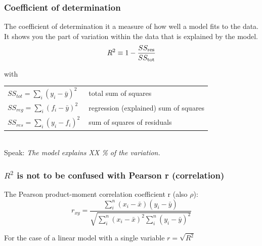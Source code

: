 \documentclass[xcolor=table, xcolor=dvipsnames]{beamer}\usepackage[]{graphicx}\usepackage[]{color}
\makeatletter
\newcommand{\hlcom}[1]{\textcolor[rgb]{0,0.392,0}{\textit{#1}}}
\newcommand{\hlopt}[1]{\textcolor[rgb]{0,0,0}{#1}}
\newcommand{\hlstd}[1]{\textcolor[rgb]{0,0,0}{#1}}
\newcommand{\hlkwd}[1]{\textcolor[rgb]{0,0,1}{#1}}
\newenvironment{kframe}{%
 \def\at@end@of@kframe{}%
 \ifinner\ifhmode%
  \def\at@end@of@kframe{\end{minipage}}%
  \begin{minipage}{\columnwidth}%
 \fi\fi%
 \def\FrameCommand##1{\hskip\@totalleftmargin \hskip-\fboxsep
 \colorbox{shadecolor}{##1}\hskip-\fboxsep
     \hskip-\linewidth \hskip-\@totalleftmargin \hskip\columnwidth}%
 \MakeFramed {\advance\hsize-\width
   \@totalleftmargin\z@ \linewidth\hsize
   \@setminipage}}%
 {\par\unskip\endMakeFramed%
 \at@end@of@kframe}
\newenvironment{knitrout}{}{} %
\makeatother
\begin{document}

\begin{frame}[fragile]\frametitle{Coefficient of determination}
The coefficient of determination it a measure of how well a model fits to the data.\\
It shows you the part of variation within the data that is explained by the model.\\

\[R^2 \equiv 1 - \frac{SS_{\rm res}}{SS_{\rm tot}} \] 

with\\[\baselineskip]
\begin{tabular}{ll}
\(SS_{tot}=\sum_i (y_i-\bar{y})^2 \) & total sum of squares\\
\(SS_{reg}=\sum_i (f_i -\bar{y})^2 \)& regression (explained) sum of squares\\
\(SS_{res}=\sum_i (y_i - f_i)^2\ \) & sum of squares of residuals\\
\end{tabular} \\[\baselineskip]

Speak: \textit{The model explains XX \% of the variation.}
\end{frame}


\begin{frame}[fragile]\frametitle{$R^2$ is not to be confused with Pearson r (correlation)}

The Pearson product-moment correlation coefficient r (also $\rho$):
\[ r_{xy} = \frac{
\sum_i^n(x_i - \bar{x})(y_i - \bar{y})
}{
\sqrt{\sum_i^n(x_i - \bar{x})^2 \sum_i^n(y_i - \bar{y})^2}}
\]

For the case of a linear model with a single variable $r=\sqrt{R^2}$
\end{frame}


\end{document}
